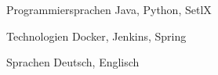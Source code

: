 

\begin{cvskills}

  \cvskill
    {Programmiersprachen} %
    {Java, Python, SetlX} %

  \cvskill
    {Technologien} %
    {Docker, Jenkins, Spring} %

  \cvskill
    {Sprachen} %
    {Deutsch, Englisch} %

\end{cvskills}
